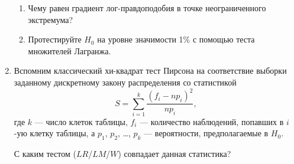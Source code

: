 \begin{enumerate}[resume]
    \begin{enumerate}
        \item Чему равен градиент лог-правдоподобия в точке неограниченного экстремума?
        \item Протестируйте $H_0$ на уровне значимости 1\% с помощью теста множителей Лагранжа.
    \end{enumerate}

    \item Вспомним классический хи-квадрат тест Пирсона на соответствие выборки заданному дискретному закону распределения со 
    статистикой 
    \[
    S = \sum_{i=1}^k \frac{(f_i - np_i)^2}{np_i},
    \]
    где $k$ — число клеток таблицы, $f_i$ — количество наблюдений, попавших в $i$-ую клетку таблицы, а $p_1$, $p_2$, \dots, $p_k$ — вероятности, предполагаемые в $H_0$.
    
    С каким тестом ($LR$/$LM$/$W$) совпадает данная статистика?
    
    
\end{enumerate}

